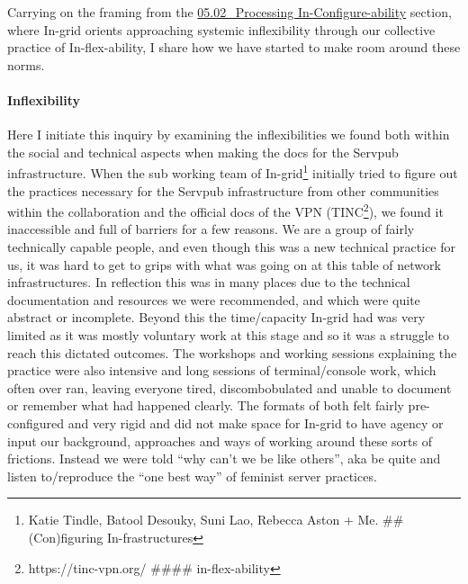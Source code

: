 Carrying on the framing from the
\href{05.02_Processing\%20In-Configure-ability.md}{05.02\_Processing
In-Configure-ability} section, where In-grid orients approaching
systemic inflexibility through our collective practice of
In-flex-ability, I share how we have started to make room around these
norms.

\hypertarget{inflexibility}{%
\paragraph{Inflexibility}\label{inflexibility}}

Here I initiate this inquiry by examining the inflexibilities we found
both within the social and technical aspects when making the docs for
the Servpub infrastructure. When the sub working team of
In-grid\footnote{Katie Tindle, Batool Desouky, Suni Lao, Rebecca Aston +
  Me. \#\# (Con)figuring In-frastructures} initially tried to figure out
the practices necessary for the Servpub infrastructure from other
communities within the collaboration and the official docs of the VPN
(TINC\footnote{https://tinc-vpn.org/ \#\#\#\# in-flex-ability}), we
found it inaccessible and full of barriers for a few reasons. We are a
group of fairly technically capable people, and even though this was a
new technical practice for us, it was hard to get to grips with what was
going on at this table of network infrastructures. In reflection this
was in many places due to the technical documentation and resources we
were recommended, and which were quite abstract or incomplete. Beyond
this the time/capacity In-grid had was very limited as it was mostly
voluntary work at this stage and so it was a struggle to reach this
dictated outcomes. The workshops and working sessions explaining the
practice were also intensive and long sessions of terminal/console work,
which often over ran, leaving everyone tired, discombobulated and unable
to document or remember what had happened clearly. The formats of both
felt fairly pre-configured and very rigid and did not make space for
In-grid to have agency or input our background, approaches and ways of
working around these sorts of frictions. Instead we were told ``why
can't we be like others'', aka be quite and listen to/reproduce the
``one best way'' of feminist server practices.

